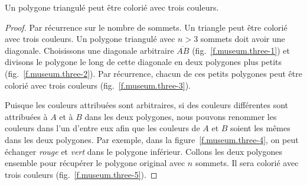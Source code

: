 \begin{theorem}
Un polygone triangulé peut être colorié avec trois couleurs.\label{thm.colored}
\end{theorem}

\begin{proof}
Par récurrence sur le nombre de sommets. Un triangle peut être colorié avec trois couleurs. Un polygone triangulé avec $n>3$ sommets doit avoir une diagonale. Choisissons une diagonale arbitraire $\overline{AB}$ (fig.~\ref{f.museum.three-1}) et divisons le polygone le long de cette diagonale en deux polygones plus petits (fig.~\ref{f.museum.three-2}). Par récurrence, chacun de ces petits polygones peut être colorié avec trois couleurs  (fig.~\ref{f.museum.three-3}).

Puisque les couleurs attribuées sont arbitraires, si des couleurs différentes sont attribuées à $A$ et à $B$ dans les deux polygones, nous pouvons renommer les couleurs dans l'un d'entre eux afin que les couleurs de $A$ et $B$ soient les mêmes dans les deux polygones. Par exemple, dans la figure~\ref{f.museum.three-4}, on peut échanger \emph{rouge} et \emph{vert} dans le polygone inférieur.
Collons les deux polygones ensemble pour récupérer le polygone original avec $n$ sommets. Il sera colorié avec trois couleurs  (fig.~\ref{f.museum.three-5}).\qedhere
\end{proof}

\vspace{0.4cm}

